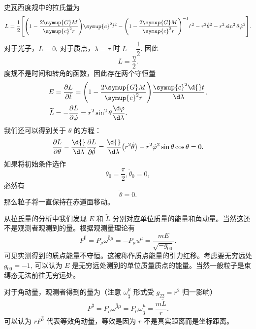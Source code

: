 \documentclass[UTF8, 12pt, a4paper, oneside, onecolumn, fontset=none]{ctexart}
\begin{document}
史瓦西度规中的拉氏量为
\begin{equation}
L=\frac{1}{2}\mleft[\mleft(1-\frac{2\symup{G}M}{\symup{c}^{2}r}\mright)\symup{c}^{2}\dot{t}^{2}-\mleft(1-\frac{2\symup{G}M}{\symup{c}^{2}r}\mright)^{-1}\dot{r}^{2}-r^{2}\dot{\theta}^{2}-r^{2}\sin^{2}{\theta}\dot{\varphi}^{2}\mright].
\end{equation}
对于光子，$L=0$, 对于质点，$\lambda=\tau$ 时 $L=\dfrac{1}{2}$. 因此
\begin{equation}
L=\frac{\eta}{2}.
\end{equation}
度规不是时间和转角的函数，因此存在两个守恒量
\begin{align}
E&=\frac{\partial{}L}{\partial\dot{t}}=\mleft(1-\frac{2\symup{G}M}{\symup{c}^{2}r}\mright)\frac{\symup{c}^{2}\d{}t}{\d\lambda},\\
\widetilde{L}&=-\frac{\partial{}L}{\partial\dot{\varphi}}=r^{2}\sin^{2}{\theta}\frac{\d\varphi}{\d\lambda}.
\end{align}
我们还可以得到关于 $\theta$ 的方程：
\begin{equation}
\frac{\partial{}L}{\partial\theta}-\frac{\d{}}{\d\lambda}\frac{\partial{}L}{\partial\dot{\theta}}=\frac{\d{}}{\d\lambda}\mleft(r^{2}\dot{\theta}\mright)-r^{2}\dot{\varphi}^{2}\sin{\theta}\cos{\theta}=0.
\end{equation}
如果将初始条件选作
\begin{equation}
\theta_{0}=\frac{\pi}{2},\dot{\theta}_{0}=0,
\end{equation}
必然有
\begin{equation}
\ddot{\theta}=0.
\end{equation}
那么粒子将一直保持在赤道面移动。

从拉氏量的分析中我们发现 $E$ 和 $\widetilde{L}$ 分别对应单位质量的能量和角动量。当然这还不是观测者观测到的量。根据观测量理论有
\begin{equation}
P^{\hat{0}}=P_{\mu}\omega^{\hat{0}\mu}=-P_{\mu}u^{\mu}=\frac{mE}{\sqrt{-g_{00}}}.
\end{equation}
可见实测得到的质点能量不守恒。这被称作质点能量的引力红移。考虑要无穷远处 $g_{00}=-1$, 可以认为 $E$ 是无穷远处测到的单位质量质点的能量。当然一般粒子是束缚态无法前往无穷远处。

对于角动量，观测者得到的量为（注意 $\omega_{\hat{3}}^{\mu}$ 形式受 $g_{22}=r^{2}$ 归一影响）
\begin{equation}
P^{\hat{3}}=P_{\mu}\omega^{\hat{3}\mu}=P_{\mu}\omega^{\mu}_{\hat{3}}=\frac{m\widetilde{L}}{r}.
\end{equation}
可以认为 $r P^{\hat{3}}$ 代表等效角动量，等效是因为 $r$ 不是真实距离而是坐标距离。
\end{document}
